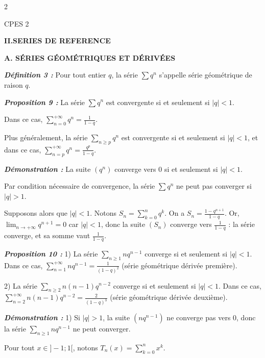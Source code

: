 \documentclass[10pt,a4paper]{article}
\begin{document}
\begin{multicols}{2}

\begin{flushright}
\footnotesize CPES 2
\end{flushright}
\vspace{-0.2cm}

\textbf{\textcolor{mainbrown}{II.\quad SERIES DE REFERENCE}}

\vspace{0.1cm}
\textbf{\textcolor{maingreen}{A. SÉRIES GÉOMÉTRIQUES ET DÉRIVÉES}}

\textbf{\textit{Définition 3 :}} Pour tout entier $q$, la série $\sum q^n$ s'appelle série géométrique de raison $q$.

\textbf{\textit{Proposition 9 :}} La série $\sum q^n$ est convergente si et seulement si $|q| < 1$.

Dans ce cas, $\sum_{n=0}^{+\infty} q^n = \frac{1}{1-q}$.

Plus généralement, la série $\sum_{n \ge p} q^n$ est convergente si et seulement si $|q| < 1$, et dans ce cas, $\sum_{n=p}^{+\infty} q^n = \frac{q^p}{1-q}$.

\textbf{\textit{Démonstration :}} La suite $(q^n)$ converge vers 0 si et seulement si $|q| < 1$.

Par condition nécessaire de convergence, la série $\sum q^n$ ne peut pas converger si $|q| > 1$.

Supposons alors que $|q| < 1$. Notons $S_n = \sum_{k=0}^n q^k$. On a $S_n = \frac{1-q^{n+1}}{1-q}$. Or, $\lim_{n \to +\infty} q^{n+1} = 0$ car $|q| < 1$, donc la suite $(S_n)$ converge vers $\frac{1}{1-q}$ : la série converge, et sa somme vaut $\frac{1}{1-q}$.

\textbf{\textit{Proposition 10 :}} 1) La série $\sum_{n \ge 1} n q^{n-1}$ converge si et seulement si $|q| < 1$. Dans ce cas, $\sum_{n=1}^{+\infty} n q^{n-1} = \frac{1}{(1-q)^2}$ (série géométrique dérivée première).

2) La série $\sum_{n \ge 2} n(n-1) q^{n-2}$ converge si et seulement si $|q| < 1$. Dans ce cas, $\sum_{n=2}^{+\infty} n(n-1) q^{n-2} = \frac{2}{(1-q)^3}$ (série géométrique dérivée deuxième).

\textbf{\textit{Démonstration :}} 1) Si $|q| > 1$, la suite $(n q^{n-1})$ ne converge pas vers 0, donc la série $\sum_{n \ge 1} n q^{n-1}$ ne peut converger.

Pour tout $x \in ]-1; 1[$, notons $T_n(x) = \sum_{k=0}^n x^k$.


\end{multicols}
\end{document}
